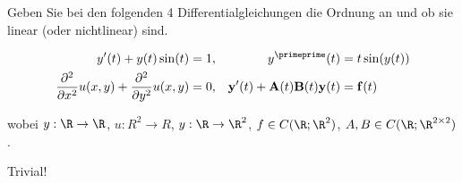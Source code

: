 \begin{exercise}

Geben Sie bei den folgenden 4 Differentialgleichungen die Ordnung an und ob sie linear (oder nichtlinear)
sind.

\begin{align*}
  y^\prime(t) + y(t) \sin(t) & = 1, &
  y^\primeprime(t) & = t \sin(y(t)) \\
  \frac{\partial^2}{\partial x^2} u(x, y) + \frac{\partial^2}{\partial y^2} u(x, y) & = 0, &
  \mathbf{y}^\prime(t) + \mathbf{A}(t) \mathbf{B}(t) \mathbf{y}(t) & = \mathbf{f}(t)
\end{align*}

wobei $y: \R \to \R$, $u: R^2 \to R$, $y: \R \to \R^2$, $f \in C(\R; \R^2)$, $A, B \in C(\R; \R^{2 \times 2})$.

\end{exercise}

\begin{solution}

Trivial!

\end{solution}
